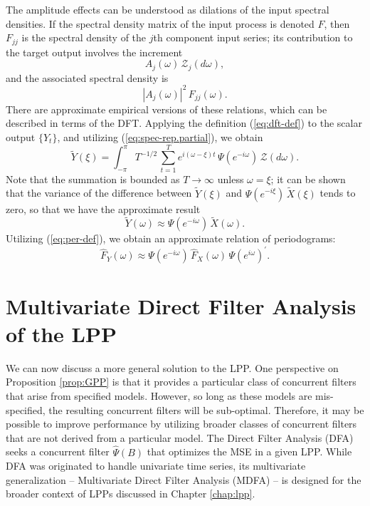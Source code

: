\documentclass[a4paper]{book}
\def\tends{\rightarrow}
\begin{document}
\vspace{.5cm}

The amplitude effects can be understood as dilations of the input spectral densities.  
 If the spectral density matrix of the input process is denoted $F$, then $F_{jj}$
 is the spectral density of the $j$th component input series; its contribution to
 the target output involves the increment
\[
 A_j ( \omega ) \,    \mathcal{Z}_j (d\omega),
\]
 and the associated spectral density is
\[
  {| A_j (\omega) |}^2 \, F_{jj} (\omega).
\]
 There are approximate empirical versions of these relations, which can be described in  
 terms of the DFT.  Applying the definition (\ref{eq:dft-def}) to the scalar output $\{ Y_t \}$,
  and utilizing (\ref{eq:spec-rep.partial}), we obtain
\[
  \widetilde{Y} (\xi) = \int_{-\pi}^{\pi} T^{-1/2} \, \sum_{t=1}^T e^{i (\omega - \xi) t}
 \, \Psi (e^{-i \omega}) \, \mathcal{Z} (d\omega).
\]
  Note that the summation is bounded as $T \tends \infty$ unless $\omega = \xi$; it can be shown
 that the variance of the difference between $\widetilde{Y} (\xi)$ and 
 $\Psi(e^{-i \xi}) \, \widetilde{X} (\xi)$ tends to zero, so that we have the approximate result
\begin{equation}
\label{convolution-dft}
  \widetilde{Y} (\omega) \approx \Psi(e^{-i \omega}) \, \widetilde{X} (\omega).
\end{equation}
  Utilizing (\ref{eq:per-def}), we obtain an approximate relation of periodograms:
\begin{equation}
 \label{convolution-per}
  \widehat{F}_Y (\omega) \approx  \Psi(e^{-i \omega}) \, \widehat{F}_X (\omega) \, 
  {   \Psi(e^{i \omega})  }^{\prime}.
\end{equation}
  
  



\section{Multivariate Direct Filter Analysis of the LPP}

 We can now discuss a more general solution to the LPP.
 One perspective on  Proposition \ref{prop:GPP} is that it provides a
 particular class of concurrent filters that arise from  specified models.  
  However, so long as these models are mis-specified, the resulting
 concurrent filters will be sub-optimal.  Therefore, it may be possible
  to improve performance by  utilizing broader classes of concurrent filters
 that are not derived from a particular model.    
 The Direct Filter Analysis (DFA) seeks a concurrent filter 
 $\widehat{\Psi} (B)$ that optimizes the MSE in a given LPP.
  While   DFA was originated to handle univariate time series, its
 multivariate generalization -- Multivariate Direct Filter Analysis (MDFA) --
 is designed for the broader context of LPPs discussed in Chapter 
  \ref{chap:lpp}.
   
\end{document}
